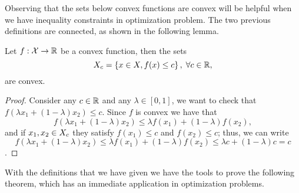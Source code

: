 Observing that the sets below convex functions are convex will be helpful when we have inequality constraints in optimization problem.
The two previous definitions are connected, as shown in the following lemma.
\begin{lemma}
    Let $f: \mathcal{X} \to \mathbb{R}$ be a convex function, then the sets
    $$X_c = \left\{x \in X, f(x) \leq c\right\}, \; \forall c \in \mathbb{R}, $$
    are convex.
\end{lemma}
\begin{proof}
    Consider any $c \in \mathbb{R}$ and any $\lambda \in [0, 1]$, we want to check that $f(\lambda x_1 + (1 - \lambda) x_2) \leq c$.
    Since $f$ is convex we have that 
    $$f\left(\lambda x_1 + (1 - \lambda) x_2 \right) \leq \lambda f(x_1) + (1 - \lambda) f(x_2) ,$$
    and if $x_1, x_2 \in X_c$ they satisfy
    $f(x_1) \leq c$ and $f(x_2) \leq c$; thus, we can write 
    $$f\left(\lambda x_1 + (1 - \lambda) x_2 \right) \leq \lambda f(x_1) + (1 - \lambda) f(x_2) \leq \lambda c + (1 - \lambda) c = c$$.
\end{proof}

With the definitions that we have given we have the tools to prove the following theorem, which has an immediate application in optimization problems.

